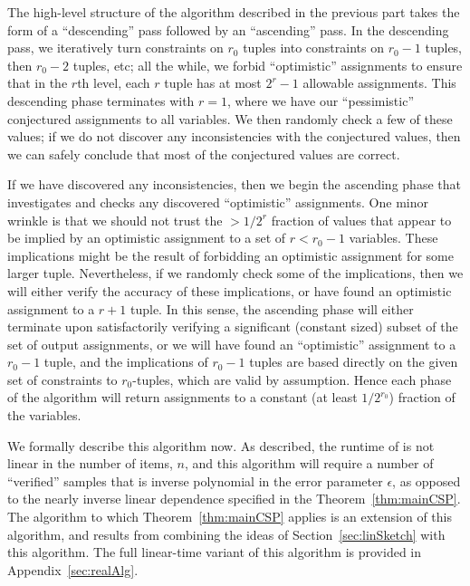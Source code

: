 \documentclass[final,12pt]{colt2018}
\newcommand{\eps}{\epsilon}
\begin{document}
The high-level structure of the algorithm described in the previous part takes the form of a ``descending'' pass followed by an ``ascending'' pass.  In the descending pass,  we iteratively turn constraints on $r_0$ tuples into constraints on $r_0-1$ tuples, then $r_0-2$ tuples, etc; all the while, we forbid ``optimistic'' assignments to ensure that in the $r$th level, each $r$ tuple has at most $2^{r}-1$ allowable assignments.   This descending phase terminates with $r=1$, where we have our ``pessimistic'' conjectured assignments to all variables.  We then randomly check a few of these values; if we do not discover any inconsistencies with the conjectured values, then we can safely conclude that most of the conjectured values are correct.  

If we have discovered any inconsistencies, then we begin the ascending phase that investigates and checks any discovered ``optimistic'' assignments.  One minor wrinkle is that we should not trust the $>1/2^{r}$ fraction of values that appear to be implied by an  optimistic assignment to a set of $r < r_0-1$ variables.  These implications might be the result of forbidding an optimistic assignment for some larger tuple.  Nevertheless, if we randomly check some of the implications, then we will either verify the accuracy of these implications, or have found an optimistic assignment to a $r+1$ tuple.  In this sense, the ascending phase will either terminate upon satisfactorily verifying a significant (constant sized) subset of the set of output assignments, or we will have found an ``optimistic'' assignment to a  $r_0-1$ tuple, and the implications of $r_0-1$ tuples are based directly on the given set of constraints to $r_0$-tuples, which are valid by assumption.  Hence each phase of the algorithm will return assignments to a constant (at least $1/2^{r_0}$) fraction of the variables.

We formally describe this algorithm now.  As described, the runtime of is not linear in the number of items, $n$, and this algorithm will require a number of ``verified'' samples that is inverse polynomial in the error parameter $\eps$, as opposed to the nearly inverse linear dependence specified in the Theorem~\ref{thm:mainCSP}.   The algorithm to which Theorem~\ref{thm:mainCSP} applies is an extension of this algorithm, and results from combining the ideas of Section~\ref{sec:linSketch} with this algorithm.  The full linear-time variant of this algorithm is provided in Appendix~\ref{sec:realAlg}.
\end{document}
